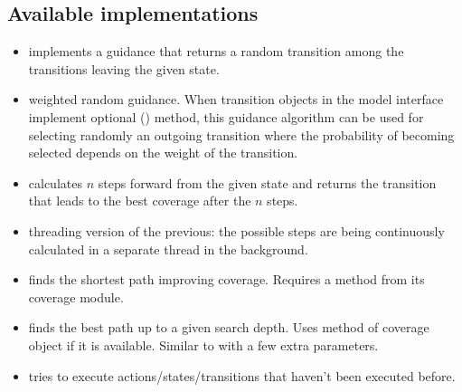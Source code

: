 \documentclass{article}
\begin{document}
\subsection{Available implementations}

\begin{itemize}
\item {} implements a guidance that
  returns a random transition among the transitions leaving the given
  state.
\item {} weighted random guidance. When
  transition objects in the model interface implement optional
  () method, this guidance algorithm can be used
  for selecting randomly an outgoing transition where the probability
  of becoming selected depends on the weight of the transition.
\item {} calculates $n$ steps forward from
  the given state and returns the transition that leads to the best
  coverage after the $n$ steps.
\item {} threading version of the
  previous: the possible steps are being continuously calculated in a
  separate thread in the background.
\item {} finds the shortest path improving
  coverage. Requires a  method from its
  coverage module.
\item {} finds the best path up to a given search
  depth. Uses  method of coverage object if it
  is available. Similar to  with a few extra
  parameters.
\item {} tries to execute actions/states/transitions
  that haven't been executed before.
\end{itemize}
\end{document}
